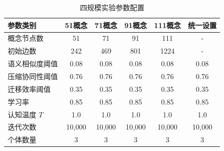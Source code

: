 \documentclass[12pt,a4paper]{article}
\begin{document}
\begin{table}[h]
\centering
\caption{四规模实验参数配置}
\label{tab:multi_scale_config}
\begin{tabular}{lccccc}
\toprule
\textbf{参数类别} & \textbf{51概念} & \textbf{71概念} & \textbf{91概念} & \textbf{111概念} & \textbf{统一设置} \\
\midrule
概念节点数 & 51 & 71 & 91 & 111 & - \\
初始边数 & 242 & 469 & 801 & 1224 & - \\
语义相似度阈值 & 0.08 & 0.08 & 0.08 & 0.08 & 0.08 \\
压缩协同性阈值 & 0.76 & 0.76 & 0.76 & 0.76 & 0.76 \\
迁移效率阈值 & 0.35 & 0.35 & 0.35 & 0.35 & 0.35 \\
学习率 & 0.85 & 0.85 & 0.85 & 0.85 & 0.85 \\
认知温度 $T$ & 1.0 & 1.0 & 1.0 & 1.0 & 1.0 \\
迭代次数 & 10,000 & 10,000 & 10,000 & 10,000 & 10,000 \\
个体数量 & 3 & 3 & 3 & 3 & 3 \\
\bottomrule
\end{tabular}
\end{table}
\end{document}
